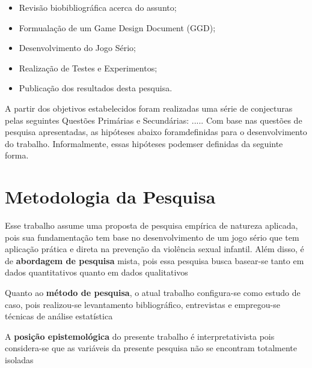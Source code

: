 \begin{itemize}
    \item Revisão biobibliográfica acerca do assunto;
    \item Formualação de um Game Design Document (GGD);
    \item Desenvolvimento do Jogo Sério;
    \item Realização de Testes e Experimentos;
    \item Publicação dos resultados desta pesquisa.
 \end{itemize}

 A partir dos objetivos estabelecidos foram realizadas uma série de conjecturas pelas seguintes Questões Primárias e Secundárias: ..... Com base nas questões de pesquisa apresentadas, as hipóteses abaixo foramdefinidas para o desenvolvimento do trabalho. Informalmente, essas hipóteses podemser definidas da seguinte forma.


\section{Metodologia da Pesquisa}\label{sec:metodologia}



Esse trabalho assume uma proposta de pesquisa empírica de natureza aplicada, pois sua fundamentação tem base no desenvolvimento de um jogo sério que tem aplicação prática e direta na prevenção da violência sexual infantil. Além disso, é de \textbf{abordagem de pesquisa} mista, pois essa pesquisa busca basear-se tanto em dados quantitativos quanto em dados qualitativos %

Quanto ao \textbf{método de pesquisa}, o atual trabalho configura-se como estudo de caso, pois realizou-se levantamento bibliográfico, entrevistas e empregou-se técnicas de análise estatística %

A \textbf{posição epistemológica} do presente trabalho é interpretativista pois considera-se que as variáveis da presente pesquisa não se encontram totalmente isoladas %

